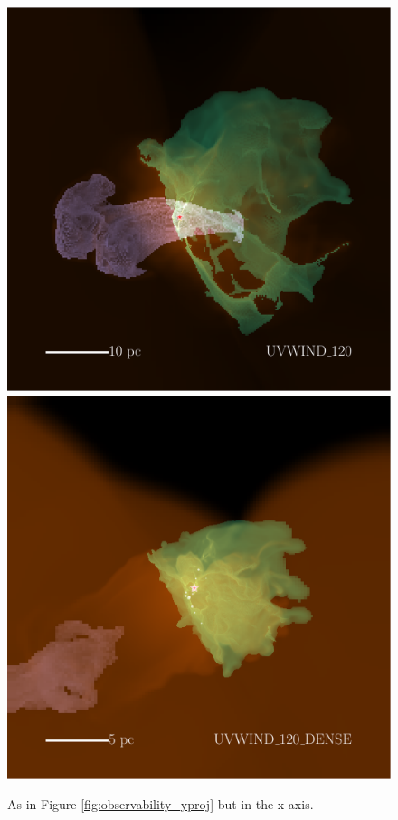 \documentclass[a4paper,fleqn,usenatbib]{mnras}
\begin{document}
\begin{figure}
	\includegraphics[width=1\columnwidth]{../plots/vis/multiray/multirayTime_coolemission_ionemission_xrayemission2__windset_120Msun0p2Myr_zoom0p5__xwindonly.pdf} \includegraphics[width=1\columnwidth]{../plots/vis/multiray/multirayTime_coolemission_ionemission_xrayemission2__windset_120Msun_dense0p2Myr_zoom1p0__xwindonly.pdf}
	\caption{As in Figure \ref{fig:observability_yproj} but in the x axis.}
	\label{fig:observability_xproj}
\end{figure}
\end{document}

